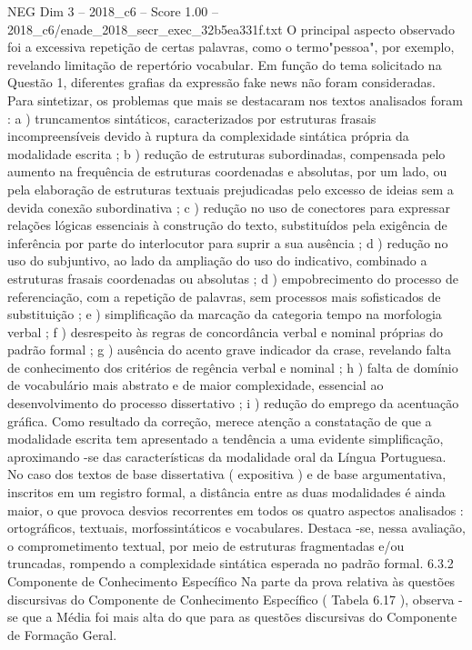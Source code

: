 \begin{textsample}{NEG Dim 3 – 2018\_c6 – Score 1.00 – 2018\_c6/enade\_2018\_secr\_exec\_32b5ea331f.txt}
O principal aspecto observado foi a excessiva repetição de certas palavras, como o termo"pessoa", por exemplo, revelando limitação de repertório vocabular.
Em função do tema solicitado na Questão 1, diferentes grafias da expressão fake news não foram consideradas.
Para sintetizar, os problemas que mais se destacaram nos textos analisados foram : a ) truncamentos sintáticos, caracterizados por estruturas frasais incompreensíveis devido à ruptura da complexidade sintática própria da modalidade escrita ; b ) redução de estruturas subordinadas, compensada pelo aumento na frequência de estruturas coordenadas e absolutas, por um lado, ou pela elaboração de estruturas textuais prejudicadas pelo excesso de ideias sem a devida conexão subordinativa ; c ) redução no uso de conectores para expressar relações lógicas essenciais à construção do texto, substituídos pela exigência de inferência por parte do interlocutor para suprir a sua ausência ; d ) redução no uso do subjuntivo, ao lado da ampliação do uso do indicativo, combinado a estruturas frasais coordenadas ou absolutas ; d ) empobrecimento do processo de referenciação, com a repetição de palavras, sem processos mais sofisticados de substituição ; e ) simplificação da marcação da categoria tempo na morfologia verbal ; f ) desrespeito às regras de concordância verbal e nominal próprias do padrão formal ; g ) ausência do acento grave indicador da crase, revelando falta de conhecimento dos critérios de regência verbal e nominal ; h ) falta de domínio de vocabulário mais abstrato e de maior complexidade, essencial ao desenvolvimento do processo dissertativo ; i ) redução do emprego da acentuação gráfica.
Como resultado da correção, merece atenção a constatação de que a modalidade escrita tem apresentado a tendência a uma evidente simplificação, aproximando -se das características da modalidade oral da Língua Portuguesa.
No caso dos textos de base dissertativa ( expositiva ) e de base argumentativa, inscritos em um registro formal, a distância entre as duas modalidades é ainda maior, o que provoca desvios recorrentes em todos os quatro aspectos analisados : ortográficos, textuais, morfossintáticos e vocabulares.
Destaca -se, nessa avaliação, o comprometimento textual, por meio de estruturas fragmentadas e/ou truncadas, rompendo a complexidade sintática esperada no padrão formal. 6.3.2 Componente de Conhecimento Específico Na parte da prova relativa às questões discursivas do Componente de Conhecimento Específico ( Tabela 6.17 ), observa -se que a Média foi mais alta do que para as questões discursivas do Componente de Formação Geral.

\end{textsample}
